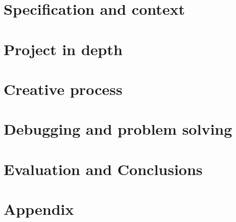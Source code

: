 \documentclass[12pt]{report}
\begin{document}
\chapter{Specification and context}
\label{sec:org3e645ad}
\chapter{Project in depth}
\label{sec:orgfcff51c}
\chapter{Creative process}
\label{sec:orga729303}
\chapter{Debugging and problem solving}
\label{sec:org420fcad}
\chapter{Evaluation and Conclusions}
\label{sec:orgbb45333}
 


\chapter{Appendix}
\label{sec:org83262b3}
\end{document}
